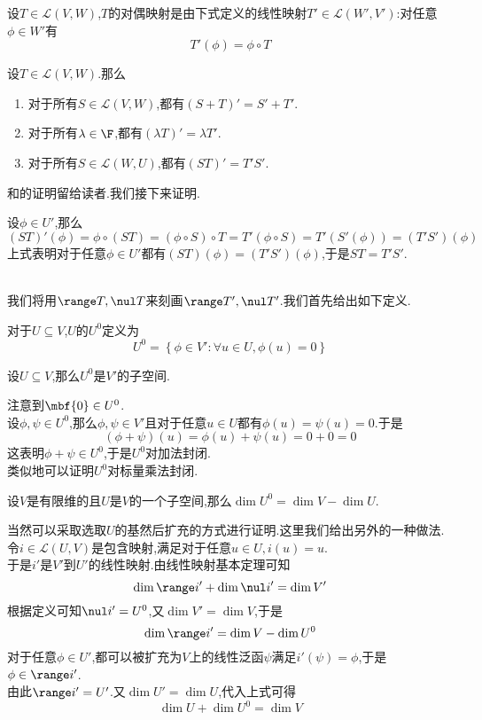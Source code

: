 \documentclass{ctexart}
\begin{document}
\begin{definition}[1.7 对偶映射]
    设$T\in\mathcal{L}(V,W)$,$T$的对偶映射是由下式定义的线性映射$T'\in\mathcal{L}(W',V')$:对任意$\phi\in W'$有
    $$T'(\phi)=\phi\circ T$$
\end{definition}
\begin{formal}[1.8 对偶映射的代数性质]
    设$T\in\mathcal{L}(V,W)$.那么
    \begin{enumerate}[label=\tbf{(\arabic*)}]
        \item 对于所有$S\in\mathcal{L}(V,W)$,都有$(S+T)'=S'+T'$.
        \item 对于所有$\lambda\in\F$,都有$(\lambda T)'=\lambda T'$.
        \item 对于所有$S\in\mathcal{L}(W,U)$,都有$(ST)'=T'S'$.
    \end{enumerate}
\end{formal}\noindent
{}和的证明留给读者.我们接下来证明.
\begin{solution}[Proof.]
    设$\phi\in U'$,那么
    $$(ST)'(\phi)=\phi\circ(ST)=(\phi\circ S)\circ T=T'(\phi\circ S)=T'(S'(\phi))=(T'S')(\phi)$$
    上式表明对于任意$\phi\in U'$都有$(ST)(\phi)=(T'S')(\phi)$,于是$ST=T'S'$.
\end{solution}\noindent
{}\\
我们将用$\range T,\nul T$来刻画$\range T',\nul T'$.我们首先给出如下定义.
\begin{definition}[2.1 定义:零化子]
    对于$U\subseteq V$,$U$的$U^{0}$定义为
    $$U^0=\left\{\phi\in V':\forall u\in U,\phi(u)=0\right\}$$
\end{definition}
\begin{formal}[2.2 零化子是子空间]
    设$U\subseteq V$,那么$U^0$是$V'$的子空间.
\end{formal}
\begin{solution}[Proof.]
    注意到$\mbf{0}\in U^0$.\\
    设$\phi,\psi\in U^0$,那么$\phi,\psi\in V'$且对于任意$u\in U$都有$\phi(u)=\psi(u)=0$.于是
    $$(\phi+\psi)(u)=\phi(u)+\psi(u)=0+0=0$$
    这表明$\phi+\psi\in U^0$,于是$U^0$对加法封闭.\\
    类似地可以证明$U^0$对标量乘法封闭.
\end{solution}
\begin{formal}[2.3 零化子的维数]
    设$V$是有限维的且$U$是$V$的一个子空间,那么$\dim U^0=\dim V-\dim U$.
\end{formal}
\begin{solution}[Proof.]
    当然可以采取选取$U$的基然后扩充的方式进行证明.这里我们给出另外的一种做法.\\
    令$i\in\mathcal{L}(U,V)$是包含映射,满足对于任意$u\in U,i(u)=u$.\\
    于是$i'$是$V'$到$U'$的线性映射.由线性映射基本定理可知
    $$\dim\range i'+\dim\nul i'=\dim V'$$
    根据定义可知$\nul i'=U^0$,又$\dim V'=\dim V$,于是$$\dim\range i'=\dim V-\dim U^0$$
    对于任意$\phi\in U'$,都可以被扩充为$V$上的线性泛函$\psi$满足$i'(\psi)=\phi$,于是$\phi\in\range i'$.\\
    由此$\range i'=U'$.又$\dim U'=\dim U$,代入上式可得
    $$\dim U+\dim U^0=\dim V$$
\end{solution}\noindent
\end{document}
